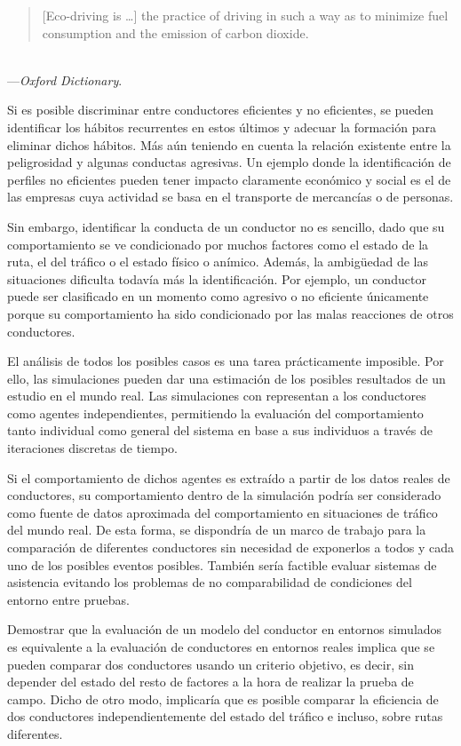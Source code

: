 \blockquote{[Eco-driving is \ldots] the practice of driving in such a way as to minimize fuel consumption and the emission of carbon dioxide.}\\---{\textit{Oxford Dictionary}}.

Si es posible discriminar entre conductores eficientes y no eficientes, se pueden identificar los hábitos recurrentes en estos últimos y adecuar la formación para eliminar dichos hábitos. Más aún teniendo en cuenta la relación existente entre la peligrosidad y algunas conductas agresivas. Un ejemplo donde la identificación de perfiles no eficientes pueden tener impacto claramente económico y social es el de las empresas cuya actividad se basa en el transporte de mercancías o de personas.

Sin embargo, identificar la conducta de un conductor no es sencillo, dado que su comportamiento se ve condicionado por muchos factores como el estado de la ruta, el del tráfico o el estado físico o anímico. Además, la ambigüedad de las situaciones dificulta todavía más la identificación. Por ejemplo, un conductor puede ser clasificado en un momento como agresivo o no eficiente únicamente porque su comportamiento ha sido condicionado por las malas reacciones de otros conductores.

El análisis de todos los posibles casos es una tarea prácticamente imposible. Por ello, las simulaciones pueden dar una estimación de los posibles resultados de un estudio en el mundo real. Las simulaciones con  representan a los conductores como agentes independientes, permitiendo la evaluación del comportamiento tanto individual como general del sistema en base a sus individuos a través de iteraciones discretas de tiempo.

Si el comportamiento de dichos agentes es extraído a partir de los datos reales de conductores, su comportamiento dentro de la simulación podría ser considerado como fuente de datos aproximada del comportamiento en situaciones de tráfico del mundo real. De esta forma, se dispondría de un marco de trabajo para la comparación de diferentes conductores sin necesidad de exponerlos a todos y cada uno de los posibles eventos posibles. También sería factible evaluar sistemas de asistencia evitando los problemas de no comparabilidad de condiciones del entorno entre pruebas.

Demostrar que la evaluación de un modelo del conductor en entornos simulados es equivalente a la evaluación de conductores en entornos reales implica que se pueden comparar dos conductores usando un criterio objetivo, es decir, sin depender del estado del resto de factores a la hora de realizar la prueba de campo. Dicho de otro modo, implicaría que es posible comparar la eficiencia de dos conductores independientemente del estado del tráfico e incluso, sobre rutas diferentes.

